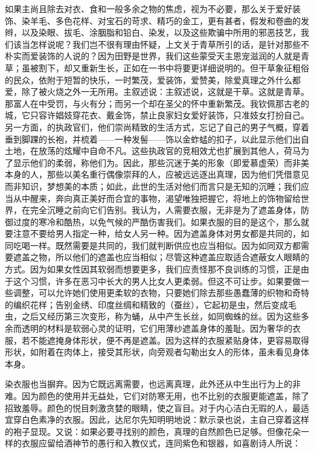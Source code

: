 如果主尚且除去对衣、食和一般多余之物的焦虑，视为不必要，那么关于爱好装饰、染羊毛、多色花样、对宝石的苛求、精巧的金工，更有甚者，假发和卷曲的发辫，以及染眼、拔毛、涂胭脂和铅白、染发，以及这些欺骗中所用的邪恶技艺，我们该当怎样说呢？我们岂不很有理由怀疑，上文关于青草所引的话，是针对那些不朴实而爱装饰的人说的？因为田野是世界，我们这些蒙受天主恩宠滋润的人就是青草；虽被割下，却又重新生长，正如在一书中将要更详细说明的。但干草象征粗俗的民众，依附于短暂的快乐，一时繁茂，爱装饰，爱赞美，除爱真理之外什么都爱，除了被火烧之外一无所用。主叙述说：主叙述说，这就是干草。这就是青草。那富人在中受罚，与火有分；而另一个却在圣父的怀中重新繁茂。我钦佩那古老的城，它只容许娼妓穿花衣、戴金饰，禁止良家妇女爱好装饰，只准妓女打扮自己。另一方面，的执政官们，他们崇尚精致的生活方式，忘记了自己的男子气概，穿着垂到脚踝的长袍，并梳着——一种发髻——饰以金蚱蜢的扣子，以此显示他们出自土地，在放荡的炫耀中自命不凡。这些执政官的竞相效尤也扩展到其他人，荷马为了显示他们的柔弱，称他们为。因此，那些沉迷于美的形象（即爱慕虚荣）而非美本身的人，那些以美名重行偶像崇拜的人，应被远远逐出真理，因为他们凭借意见而非知识，梦想美的本质；如此，此世的生活对他们而言只是无知的沉睡；我们应当从中醒来，奔向真正美好而合宜的事物，渴望唯独把握它，将地上的饰物留给世界，在完全沉睡之前向它们告别。我认为，人需要衣服，无非是为了遮盖身体，防御过度的寒冷和酷热，以免气候的严酷伤害我们。如果衣服的目的是这个，那么就要注意不要给男人指定一种，给女人另一种。因为遮盖身体对男女都是共同的，如同吃喝一样。既然需要是共同的，我们就判断供应也应当相似。因为如同双方都需要遮盖之物，所以他们的遮盖也应当相似；尽管这种遮盖应取适合遮蔽女人眼睛的方式。因为如果女性因其软弱而想要更多，我们应责怪那不良训练的习惯，正是由于这个习惯，许多在恶习中长大的男人比女人更柔弱。但这不可让步。如果要做一些调整，可以允许她们使用更柔软的衣物，只要她们除去那些愚蠢薄的织物和奇特的编织花样；告别金绣、印度丝绸和精致的（蚕丝），它起初是虫，然后变成毛虫，之后又经历第三次变形，称为蛹，从中产生长丝，如同蜘蛛的丝。因为这些多余而透明的材料是软弱心灵的证明，它们用薄纱遮盖身体的羞耻。因为奢华的衣服，若不能遮掩身体形状，便不再是遮盖。因为这样的衣服紧贴身体，更容易取得形状，如附着在肉体上，接受其形状，向旁观者勾勒出女人的形体，虽未看见身体本身。\par

染衣服也当摒弃。因为它既远离需要，也远离真理，此外还从中生出行为上的非难。因为颜色的使用并无益处，它们对防寒无用，也不比别的衣服更能遮盖，除了招致羞辱。颜色的悦目刺激贪婪的眼睛，使之盲目。对于内心洁白无瑕的人，最适宜穿白色素净的衣服。因此，达尼尔先知明明地说：默示录也说，主自己穿着这样的袍子显现。又说：如果必要寻找别的颜色，真理的自然颜色已足够。但像花朵一样的衣服应留给酒神节的愚行和入教仪式，连同紫色和银器，如喜剧诗人所说：\par

